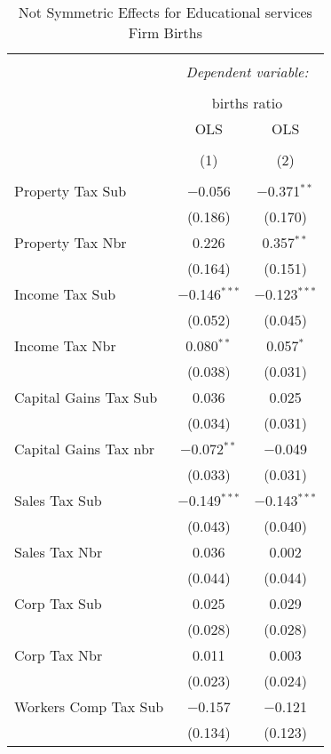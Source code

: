 
\begin{table}[!htbp] \centering 
  \caption{Not Symmetric Effects for  Educational services Firm Births} 
  \label{} 
\begin{tabular}{@{\extracolsep{5pt}}lcc} 
\\[-1.8ex]\hline 
\hline \\[-1.8ex] 
 & \multicolumn{2}{c}{\textit{Dependent variable:}} \\ 
\cline{2-3} 
\\[-1.8ex] & \multicolumn{2}{c}{births ratio} \\ 
 & OLS & OLS \\ 
\\[-1.8ex] & (1) & (2)\\ 
\hline \\[-1.8ex] 
 Property Tax Sub & $-$0.056 & $-$0.371$^{**}$ \\ 
  & (0.186) & (0.170) \\ 
  Property Tax Nbr & 0.226 & 0.357$^{**}$ \\ 
  & (0.164) & (0.151) \\ 
  Income Tax Sub & $-$0.146$^{***}$ & $-$0.123$^{***}$ \\ 
  & (0.052) & (0.045) \\ 
  Income Tax Nbr & 0.080$^{**}$ & 0.057$^{*}$ \\ 
  & (0.038) & (0.031) \\ 
  Capital Gains Tax Sub & 0.036 & 0.025 \\ 
  & (0.034) & (0.031) \\ 
  Capital Gains Tax nbr & $-$0.072$^{**}$ & $-$0.049 \\ 
  & (0.033) & (0.031) \\ 
  Sales Tax Sub & $-$0.149$^{***}$ & $-$0.143$^{***}$ \\ 
  & (0.043) & (0.040) \\ 
  Sales Tax Nbr & 0.036 & 0.002 \\ 
  & (0.044) & (0.044) \\ 
  Corp Tax Sub & 0.025 & 0.029 \\ 
  & (0.028) & (0.028) \\ 
  Corp Tax Nbr & 0.011 & 0.003 \\ 
  & (0.023) & (0.024) \\ 
  Workers Comp Tax Sub & $-$0.157 & $-$0.121 \\ 
  & (0.134) & (0.123) \\ 

\end{tabular}
\end{table}
